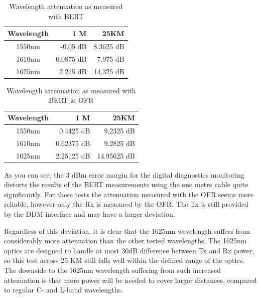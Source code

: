 \documentclass{article}
\begin{document}
\begin{table}[h]
\centering
\label{tab:attenuation-table-ber}
\begin{tabular}{|c|r|r|}
\hline 
\textbf{Wavelength} & \textbf{1 M} & \textbf{25KM}\\ 
\hline 
1550nm & -0.05 dB & 8.3625 dB\\ 
\hline 
1610nm & 0.0875 dB & 7.975 dB\\ 
\hline 
1625nm & 2.275 dB & 14.325 dB\\
\hline
\end{tabular} 
\caption{Wavelength attenuation as measured with BERT}
\end{table}

\begin{table}[h]
\centering
\label{tab:attenuation-table-ofr}
\begin{tabular}{|c|r|r|}
\hline 
\textbf{Wavelength} & \textbf{1 M} & \textbf{25KM}\\ 
\hline 
1550nm & 0.4425 dB & 9.2325 dB\\ 
\hline 
1610nm & 0.62375 dB & 9.2825 dB\\ 
\hline 
1625nm & 2.25125 dB & 14.95625 dB\\
\hline
\end{tabular}
\caption{Wavelength attenuation as measured with BERT \& OFR}
\end{table}

As you can see, the 3 dBm error margin for the digital diagnostics monitoring distorts the results of the BERT measurements using the one metre cable quite significantly.
For these tests the attenuation measured with the OFR seems more reliable, however only the Rx is measured by the OFR.
The Tx is still provided by the DDM interface and may have a larger deviation.

Regardless of this deviation, it is clear that the 1625nm wavelength suffers from considerably more attenuation than the other tested wavelengths.
The 1625nm optics are designed to handle at most 30dB difference between Tx and Rx power, so this test across 25 KM still falls well within the defined range of the optics.
The downside to the 1625nm wavelength suffering from such increased attenuation is that more power will be needed to cover larger distances, compared to regular C- and L-band wavelengths. 
\end{document}
